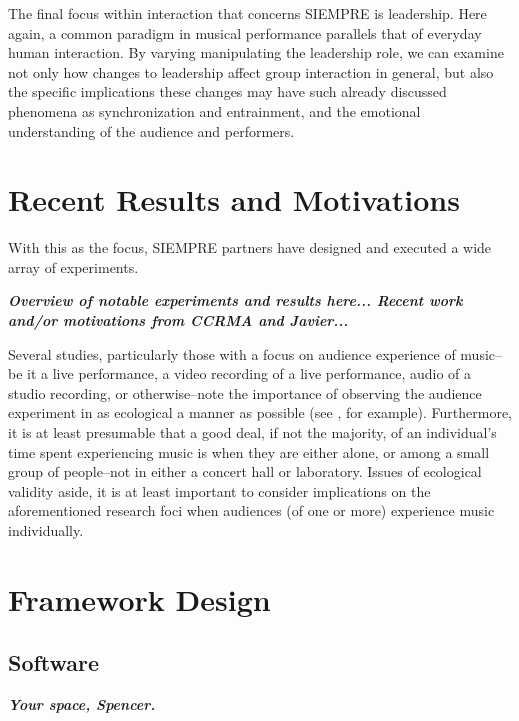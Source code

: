 \documentclass{sig-alternate}
\begin{document}
The final focus within interaction that concerns SIEMPRE is leadership.  Here again, a common paradigm in musical performance parallels that of everyday human interaction.  By varying manipulating the leadership role, we can examine not only how changes to leadership affect group interaction in general, but also the specific implications these changes may have such already discussed phenomena as synchronization and entrainment, and the emotional understanding of the audience and performers.

\section{Recent Results and Motivations}
With this as the focus, SIEMPRE partners have designed and executed a wide array of experiments.

\vspace{12pt}
\textbf{\textit{Overview of notable experiments and results here...  Recent work and/or motivations from CCRMA and Javier...}}
\vspace{12pt}

Several studies, particularly those with a focus on audience experience of music--be it a live performance, a video recording of a live performance, audio of a studio recording, or otherwise--note the importance of observing the audience experiment in as ecological a manner as possible (see \cite{Jaimovich:2012vr}, for example).  Furthermore, it is at least presumable that a good deal, if not the majority, of an individual's time spent experiencing music is when they are either alone, or among a small group of people--not in either a concert hall or laboratory.  Issues of ecological validity aside, it is at least important to consider implications on the aforementioned research foci when audiences (of one or more) experience music individually.

\section{Framework Design}
\subsection{Software}
\vspace{12pt}
\textbf{\textit{Your space, Spencer.}}
\vspace{12pt}
\end{document}
